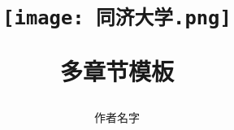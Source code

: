 \def\myTitle{\heiti 多章节模板}
\def\myAuthor{作者名字}
% 


\title{
    \begin{figure}[!h]
        \centering
        \texttt{[image: 同济大学.png]}
        \label{同济大学}
    \end{figure}

    {\Huge{\textbf{\myTitle}}}}
\author{\myAuthor}
\date{}
\maketitle




